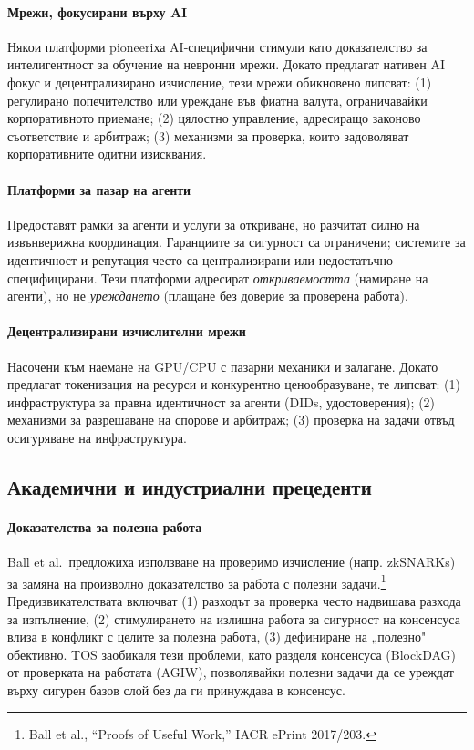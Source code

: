 \documentclass[11pt]{article}
\begin{document}
\paragraph{Мрежи, фокусирани върху AI} Някои платформи pioneeriха AI-специфични стимули като доказателство за интелигентност за обучение на невронни мрежи. Докато предлагат нативен AI фокус и децентрализирано изчисление, тези мрежи обикновено липсват: (1) регулирано попечителство или уреждане във фиатна валута, ограничавайки корпоративното приемане; (2) цялостно управление, адресиращо законово съответствие и арбитраж; (3) механизми за проверка, които задоволяват корпоративните одитни изисквания.

\paragraph{Платформи за пазар на агенти} Предоставят рамки за агенти и услуги за откриване, но разчитат силно на извънверижна координация. Гаранциите за сигурност са ограничени; системите за идентичност и репутация често са централизирани или недостатъчно специфицирани. Тези платформи адресират \emph{откриваемостта} (намиране на агенти), но не \emph{уреждането} (плащане без доверие за проверена работа).

\paragraph{Децентрализирани изчислителни мрежи} Насочени към наемане на GPU/CPU с пазарни механики и залагане. Докато предлагат токенизация на ресурси и конкурентно ценообразуване, те липсват: (1) инфраструктура за правна идентичност за агенти (DIDs, удостоверения); (2) механизми за разрешаване на спорове и арбитраж; (3) проверка на задачи отвъд осигуряване на инфраструктура.

\subsection{Академични и индустриални прецеденти}
\paragraph{Доказателства за полезна работа} Ball et al.\ предложиха използване на проверимо изчисление (напр. zkSNARKs) за замяна на произволно доказателство за работа с полезни задачи.\footnote{Ball et al., ``Proofs of Useful Work,'' IACR ePrint 2017/203.} Предизвикателствата включват (1) разходът за проверка често надвишава разхода за изпълнение, (2) стимулирането на излишна работа за сигурност на консенсуса влиза в конфликт с целите за полезна работа, (3) дефиниране на „полезно" обективно. TOS заобикаля тези проблеми, като разделя консенсуса (BlockDAG) от проверката на работата (AGIW), позволявайки полезни задачи да се уреждат върху сигурен базов слой без да ги принуждава в консенсус.
\end{document}
